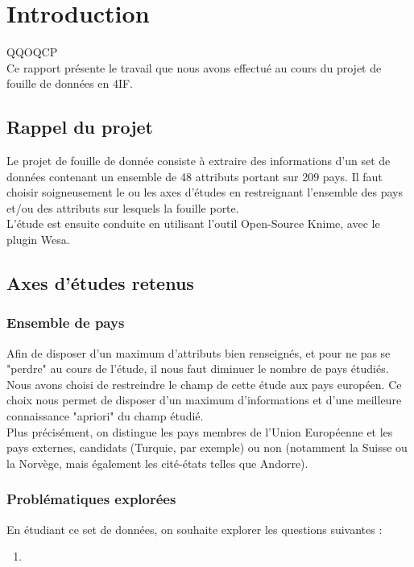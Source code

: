 \section{Introduction}

QQOQCP\\

Ce rapport présente le travail que nous avons effectué au cours du projet
de fouille de données en 4IF.


\subsection{Rappel du projet}

Le projet de fouille de donnée consiste à extraire des informations d'un
set de données contenant un ensemble de 48 attributs portant sur 209 pays.
Il faut choisir soigneusement le ou les axes d'études en restreignant
l'ensemble des pays et/ou des attributs sur lesquels la fouille porte.\\
L'étude est ensuite conduite en utilisant l'outil Open-Source Knime, avec
le plugin Wesa.


\subsection{Axes d'études retenus}

\subsubsection{Ensemble de pays}
Afin de disposer d'un maximum d'attributs bien renseignés, et pour ne pas
se "perdre" au cours de l'étude, il nous faut diminuer le nombre de pays
étudiés.\\
Nous avons choisi de restreindre le champ de cette étude aux pays européen.
Ce choix nous permet de disposer d'un maximum d'informations et d'une
meilleure connaissance "apriori" du champ étudié.\\
Plus précisément, on distingue les pays membres de l'Union Européenne et
les pays externes, candidats (Turquie, par exemple) ou non (notamment la
Suisse ou la Norvège, mais également les cité-états telles que Andorre).\\

\subsubsection{Problématiques explorées}
En étudiant ce set de données, on souhaite explorer les questions suivantes
:
\begin{enumerate}
\item
\end{enumerate}

